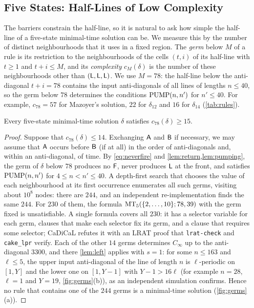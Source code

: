 \subsection{Five States: Half-Lines of Low Complexity}\label{sec:germs}

The barriers constrain the half-line, so it is natural to ask how simple the
half-line of a five-state minimal-time solution can be. We measure this by the
number of distinct neighbourhoods that it uses in a fixed region. The
\emph{germ} below $M$ of a rule is its restriction to the neighbourhoods of the
cells $(t,i)$ of its half-line with $t\ge1$ and $t+i\le M$, and its
\emph{complexity} $c_M(\delta)$ is the number of these neighbourhoods other than
$(\mathsf L,\mathsf L,\mathsf L)$. We use $M=78$: the half-line below the anti-diagonal $t+i=78$
contains the input anti-diagonals of all lines of lengths $n\le40$, so the germ
below $78$ determines the conditions $\mathrm{PUMP}(n,n')$ for $n'\le40$. For example,
$c_{78}=57$ for Mazoyer's solution, $22$ for $\delta_{12}$ and $16$ for
$\delta_{14}$ (\cref{tab:rules}).

\begin{proposition}\label{prop:germs}
Every five-state minimal-time solution $\delta$ satisfies $c_{78}(\delta)\ge15$.
\end{proposition}

\begin{proof}
Suppose that $c_{78}(\delta)\le14$. Exchanging $\mathsf A$ and $\mathsf B$ if necessary, we
may assume that $\mathsf A$ occurs before $\mathsf B$ (if at all) in the order of
anti-diagonals and, within an anti-diagonal, of time. By \eqref{eq:neverfire}
and \cref{lem:return,lem:pumping}, the germ of $\delta$ below $78$ produces no
$\mathsf F$, never produces $\mathsf L$ at the front, and satisfies $\mathrm{PUMP}(n,n')$ for $4\le
n<n'\le40$. A depth-first search that chooses the value of each neighbourhood
at its first occurrence enumerates all such germs, visiting about $10^8$ nodes:
there are $244$, and an independent re-implementation finds the same $244$.
For $230$ of them, the formula $\mathrm{MT}_5(\{2,\dots,10\};78,39)$ with the germ fixed
is unsatisfiable. A single formula covers all $230$: it has a selector variable
for each germ, clauses that make each selector fix its germ, and a clause that
requires some selector; CaDiCaL refutes it with an LRAT proof that
\texttt{lrat-check} and \texttt{cake\_lpr} verify. Each of the other $14$ germs determines
$C_\infty$ up to the anti-diagonal $3300$, and there \cref{lem:left} applies
with $s=1$: for some $n\le163$ and $\ell\le5$, the upper input anti-diagonal of
the line of length $n$ is $\ell$-periodic on $[1,Y]$ and the lower one on
$[1,Y-1]$ with $Y-1>16\ell$ (for example $n=28$, $\ell=1$ and $Y=19$,
\cref{fig:germs}(b)), as an independent simulation confirms. Hence no rule
that contains one of the $244$ germs is a minimal-time solution
(\cref{fig:germs}(a)).
\end{proof}

